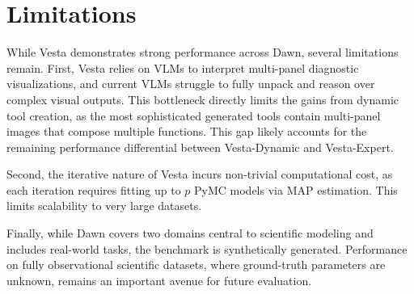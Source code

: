 \documentclass{article}
\newcommand{\method}{{\sc Vesta}}
\newcommand{\data}{{\sc Dawn}}
\newcommand{\splitlabel}[3]{%
  \tikz[baseline=-0.6ex]{%
    \node[
      rounded corners=3pt,
      fill=#2,
      draw=#1,
      line width=0.8pt,
      inner xsep=4pt,
      inner ysep=2pt,
      font=\bfseries\small
    ] {#3};%
  }%
}
\newcommand{\Astro}{\splitlabel{astroblue}{astrofill}{Astro}}
\begin{document}














\section{Limitations}
While \method{} demonstrates strong performance across \data{}, several limitations remain. First, \method{} relies on VLMs to interpret multi-panel diagnostic visualizations, and current VLMs struggle to fully unpack and reason over complex visual outputs. This bottleneck directly limits the gains from dynamic tool creation, as the most sophisticated generated tools contain multi-panel images that compose multiple functions. This gap likely accounts for the remaining 
performance differential between \method{}-Dynamic and \method{}-Expert.

Second, the iterative nature of \method{} incurs non-trivial computational cost, as each 
iteration requires fitting up to $p$ PyMC models via MAP estimation. This limits 
scalability to very large datasets.

Finally, while \data{} covers two domains central to scientific modeling and includes 
real-world \protect\Astro{} tasks, the benchmark is synthetically generated. Performance 
on fully observational scientific datasets, where ground-truth parameters are unknown, 
remains an important avenue for future evaluation.


\end{document}
